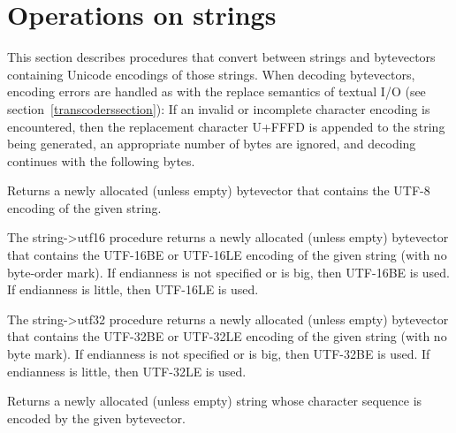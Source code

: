 \section{Operations on strings}

This section describes procedures that convert between strings and
bytevectors containing Unicode encodings of those strings.  When
decoding bytevectors, encoding errors are handled as with the {\cf
  replace} semantics of textual I/O (see
section~\ref{transcoderssection}): If an invalid or incomplete
character encoding is encountered, then the replacement character
U+FFFD is appended to the string being generated, an appropriate
number of bytes are ignored, and decoding continues with the following
bytes.

\begin{entry}{%
}

Returns a newly allocated (unless empty) bytevector that
contains the UTF-8 encoding of the given string.
\end{entry}

\begin{entry}{%
}

  The {\cf string->utf16}
  procedure returns a newly allocated (unless empty) bytevector that
contains the UTF-16BE or UTF-16LE encoding of the given string (with
no byte-order mark).  If endianness is not specified or is {\cf big},
then UTF-16BE is used.  If endianness is {\cf little}, then UTF-16LE
is used.
\end{entry}

\begin{entry}{%
}

  The {\cf string->utf32}
procedure returns
a newly allocated (unless empty) bytevector that contains the UTF-32BE
or UTF-32LE encoding of the given string (with no byte mark).  If
endianness is not specified or is {\cf big}, then UTF-32BE is used.
If endianness is {\cf little}, then UTF-32LE is used.
\end{entry}

\begin{entry}{%
}

Returns a newly allocated (unless empty) string whose character
sequence is encoded by the given bytevector.
\end{entry}

